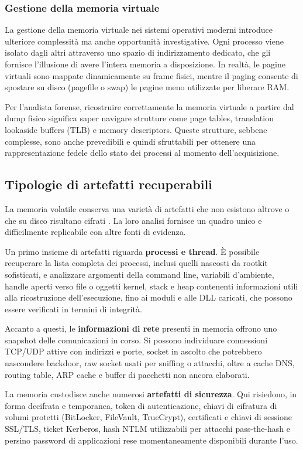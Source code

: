 \subsubsection{Gestione della memoria virtuale}
La gestione della memoria virtuale nei sistemi operativi moderni introduce ulteriore complessità ma anche opportunità investigative. Ogni processo viene isolato dagli altri attraverso uno spazio di indirizzamento dedicato, che gli fornisce l’illusione di avere l’intera memoria a disposizione. In realtà, le pagine virtuali sono mappate dinamicamente su frame fisici, mentre il paging consente di spostare su disco (pagefile o swap) le pagine meno utilizzate per liberare RAM.

Per l’analista forense, ricostruire correttamente la memoria virtuale a partire dal dump fisico significa saper navigare strutture come page tables, translation lookaside buffers (TLB) e memory descriptors. Queste strutture, sebbene complesse, sono anche prevedibili e quindi sfruttabili per ottenere una rappresentazione fedele dello stato dei processi al momento dell’acquisizione.

\subsection{Tipologie di artefatti recuperabili}

La memoria volatile conserva una varietà di artefatti che non esistono altrove o che su disco risultano cifrati \cite{case2017}. La loro analisi fornisce un quadro unico e difficilmente replicabile con altre fonti di evidenza.

Un primo insieme di artefatti riguarda \textbf{processi e thread}. È possibile recuperare la lista completa dei processi, inclusi quelli nascosti da rootkit sofisticati, e analizzare argomenti della command line, variabili d’ambiente, handle aperti verso file o oggetti kernel, stack e heap contenenti informazioni utili alla ricostruzione dell’esecuzione, fino ai moduli e alle DLL caricati, che possono essere verificati in termini di integrità.

Accanto a questi, le \textbf{informazioni di rete} presenti in memoria offrono uno snapshot delle comunicazioni in corso. Si possono individuare connessioni TCP/UDP attive con indirizzi e porte, socket in ascolto che potrebbero nascondere backdoor, raw socket usati per sniffing o attacchi, oltre a cache DNS, routing table, ARP cache e buffer di pacchetti non ancora elaborati.

La memoria custodisce anche numerosi \textbf{artefatti di sicurezza}. Qui risiedono, in forma decifrata e temporanea, token di autenticazione, chiavi di cifratura di volumi protetti (BitLocker, FileVault, TrueCrypt), certificati e chiavi di sessione SSL/TLS, ticket Kerberos, hash NTLM utilizzabili per attacchi pass-the-hash e persino password di applicazioni rese momentaneamente disponibili durante l’uso.

